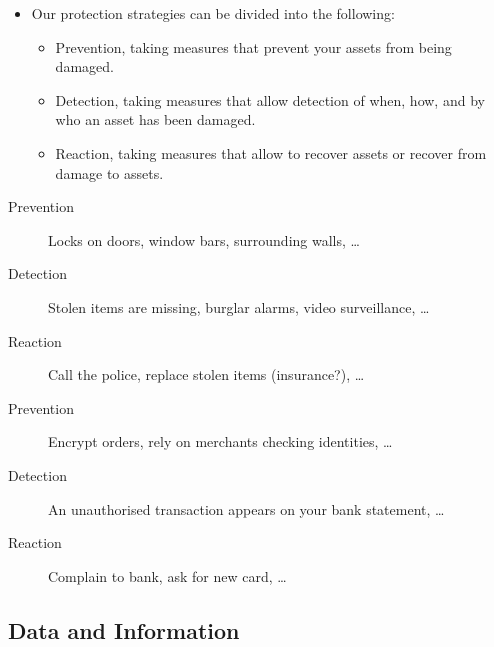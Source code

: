 \documentclass{beamer}
\begin{document}
\begin{frame}{\insertsubsectionhead}
  \begin{itemize}
    \item Our protection strategies can be divided into the following:
      \begin{itemize}
        \item Prevention, taking measures that prevent your assets from being 
          damaged.

        \item Detection, taking measures that allow detection of when, how, and 
          by who an asset has been damaged.

        \item Reaction, taking measures that allow to recover assets or recover 
          from damage to assets.
      \end{itemize}
  \end{itemize}
\end{frame}

\begin{frame}{\insertsubsectionhead}
  \begin{example}
    \begin{description}
      \item[Prevention] Locks on doors, window bars, surrounding walls, \dots
      \item[Detection] Stolen items are missing, burglar alarms, video 
        surveillance, \dots
      \item[Reaction] Call the police, replace stolen items (insurance?), \dots
    \end{description}
  \end{example}

  \begin{example}[E-commerce]
    \begin{description}
      \item[Prevention] Encrypt orders, rely on merchants checking identities, 
        \dots
      \item[Detection] An unauthorised transaction appears on your bank 
        statement, \dots
      \item[Reaction] Complain to bank, ask for new card, \dots
    \end{description}
  \end{example}
\end{frame}

\subsection{Data and Information}
\end{document}

